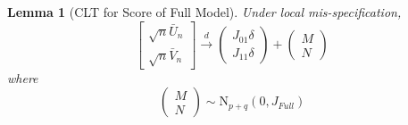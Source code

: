 \documentclass[12pt]{article}
\newtheorem{lem}{Lemma}
\theoremstyle{definition}
\begin{document}
\begin{lem}[CLT for Score of Full Model]
\label{lem:score}
Under local mis-specification,
	$$\left[\begin{array}{c}
		\sqrt{n} \bar{U}_n \\ \sqrt{n} \bar{V}_n
	\end{array}\right] \overset{d}{\rightarrow}
	\left(\begin{array}{c}
		J_{01}\delta\\
		J_{11}\delta
	\end{array}\right) + 	
	\left(\begin{array}{c}
		M\\
		N
	\end{array}\right)$$
where
	$$\left(\begin{array}{c}
		M\\
		N
	\end{array}\right) \sim \mbox{N}_{p+q}(0, J_{Full})$$
\end{lem}
\end{document}
